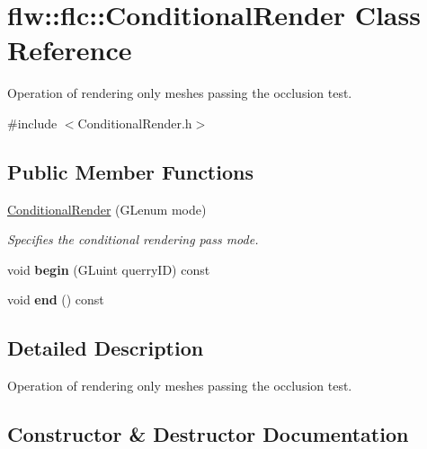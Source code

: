 \hypertarget{classflw_1_1flc_1_1ConditionalRender}{}\section{flw\+:\+:flc\+:\+:Conditional\+Render Class Reference}
\label{classflw_1_1flc_1_1ConditionalRender}


Operation of rendering only meshes passing the occlusion test.  




{\ttfamily \#include $<$Conditional\+Render.\+h$>$}

\subsection*{Public Member Functions}
\begin{DoxyCompactItemize}
\item 
\hyperlink{classflw_1_1flc_1_1ConditionalRender_aaa7bf9c82c8631afea3e70fa164be287}{Conditional\+Render} (G\+Lenum mode)
\begin{DoxyCompactList}\small\item\em Specifies the conditional rendering pass mode. \end{DoxyCompactList}\item 
void {\bfseries begin} (G\+Luint querry\+ID) const \hypertarget{classflw_1_1flc_1_1ConditionalRender_ac7aaf6e2bdf618718a358f1cee679b5c}{}\label{classflw_1_1flc_1_1ConditionalRender_ac7aaf6e2bdf618718a358f1cee679b5c}

\item 
void {\bfseries end} () const \hypertarget{classflw_1_1flc_1_1ConditionalRender_a013c1c6f402634df4affb40abb3e75df}{}\label{classflw_1_1flc_1_1ConditionalRender_a013c1c6f402634df4affb40abb3e75df}

\end{DoxyCompactItemize}


\subsection{Detailed Description}
Operation of rendering only meshes passing the occlusion test. 

\subsection{Constructor \& Destructor Documentation}
